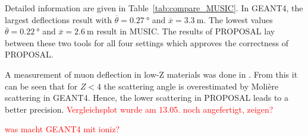Detailed information are given in Table~\ref{tab:compare_MUSIC}. In GEANT4, the 
largest deflections result with $\overline{\theta} = \SI{0.27}{\degree}$ 
and $\overline{x} = \SI{3.3}{\meter}$. The lowest values $\overline{\theta} = \SI{0.22}{\degree}$ and 
$\overline{x} = \SI{2.6}{\meter}$ result in MUSIC. The results of PROPOSAL lay between 
these two tools for all four settings which approves the 
correctness of PROPOSAL.

A measurement of muon deflection in low-Z materials was done in \cite{attwood_2006}. 
From this it can be seen that for $Z < 4$ the scattering angle is overestimated 
by Molière scattering in GEANT4. Hence, the lower scattering in PROPOSAL leads 
to a better precision.
\textcolor{red}{Vergleichsplot wurde am 13.05. noch angefertigt, zeigen?}



\textcolor{red}{was macht GEANT4 mit ioniz?}


